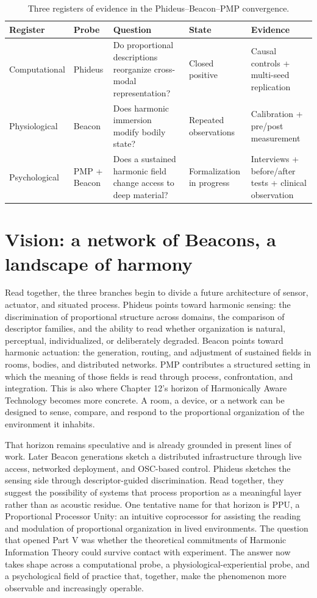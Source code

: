 \begin{table}[ht]
\centering
\caption{Three registers of evidence in the Phideus--Beacon--PMP convergence.}
\label{tab:three_registers}
\footnotesize
\begin{tabularx}{\textwidth}{@{}P{0.15\textwidth}P{0.14\textwidth}Y P{0.20\textwidth}Y@{}}
\toprule
Register & Probe & Question & State & Evidence \\
\midrule
Computa\-tional & Phideus & Do proportional descriptions reorganize cross-modal representation? & Closed positive & Causal controls + multi-seed replication \\
Physiological & Beacon & Does harmonic immersion modify bodily state? & Repeated observations & Calibration + pre/post measurement \\
Psychological & PMP + Beacon & Does a sustained harmonic field change access to deep material? & Formalization in progress & Interviews + before/after tests + clinical observation \\
\bottomrule
\end{tabularx}
\end{table}


\section{Vision: a network of Beacons, a landscape of harmony}


Read together, the three branches begin to divide a future architecture of sensor, actuator, and situated process. Phideus points toward harmonic sensing: the discrimination of proportional structure across domains, the comparison of descriptor families, and the ability to read whether organization is natural, perceptual, individualized, or deliberately degraded. Beacon points toward harmonic actuation: the generation, routing, and adjustment of sustained fields in rooms, bodies, and distributed networks. PMP contributes a structured setting in which the meaning of those fields is read through process, confrontation, and integration. This is also where Chapter 12's horizon of Harmonically Aware Technology becomes more concrete. A room, a device, or a network can be designed to sense, compare, and respond to the proportional organization of the environment it inhabits.

That horizon remains speculative and is already grounded in present lines of work. Later Beacon generations sketch a distributed infrastructure through live access, networked deployment, and OSC-based control. Phideus sketches the sensing side through descriptor-guided discrimination. Read together, they suggest the possibility of systems that process proportion as a meaningful layer rather than as acoustic residue. One tentative name for that horizon is PPU, a Proportional Processor Unity: an intuitive coprocessor for assisting the reading and modulation of proportional organization in lived environments. The question that opened Part V was whether the theoretical commitments of Harmonic Information Theory could survive contact with experiment. The answer now takes shape across a computational probe, a physiological-experiential probe, and a psychological field of practice that, together, make the phenomenon more observable and increasingly operable.
